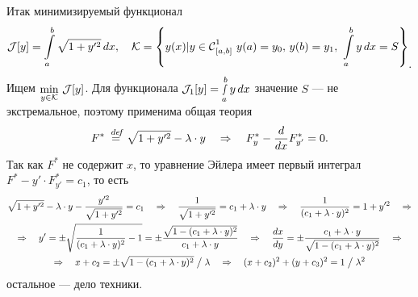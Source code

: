 Итак минимизируемый функционал
\begin{equation*}
	\hfill\J[y]=\int\limits_a^b\sqrt{1+y^{\prime2}}\,dx,\quad
	\K=\left\{y(x)|y\in\Cfn[{[a,b]}]{1}\ y(a)=y_0,\,y(b)=y_1,\ \int\limits_a^b y\,dx=S\right\}_{\displaystyle.}\hfill
\end{equation*}
Ищем $\min\limits_{y\in\mathcal{K}}\,\mathcal{J}[y]$. Для функционала $\mathcal{J}_1[y]=\smallint\limits_a^b y\,dx$ значение $S$ --- не экстремальное, поэтому применима общая теория
\begin{equation*}
	\hfill F^{\ast}\eqdef\sqrt{1+y^{\prime2}}-\lambda\cdot y\quad\Rightarrow\quad F^{\ast}_{y}-\der{}{x}F^{\ast}_{y'}=0.\hfill
\end{equation*}
Так как $F^{\ast}$ не содержит $x$, то уравнение Эйлера имеет первый интеграл $F^{\ast}-y'\cdot F^{\ast}_{y'}=c_1$, то есть
\begin{gather*}
	\sqrt{1+y^{\prime2}}-\lambda\cdot y-\frac{y^{\prime2}}{\sqrt{1+y^{\prime2}}}=c_1\quad\Rightarrow\quad
	\frac{1}{\sqrt{1+y^{\prime2}}}=c_1+\lambda\cdot y\quad\Rightarrow\quad\frac{1}{(c_1+\lambda\cdot y)^2}=1+y^{\prime2}\quad\Rightarrow\\\Rightarrow\quad y'=\pm\sqrt{\frac{1}{(c_1+\lambda\cdot y)^2}-1}=\pm\frac{\sqrt{1-(c_1+\lambda\cdot y)^2}}{c_1+\lambda\cdot y}\quad\Rightarrow\quad\frac{dx}{dy}=\pm\frac{c_1+\lambda\cdot y}{\sqrt{1-(c_1+\lambda\cdot y)^2}}\quad\Rightarrow\\\Rightarrow\quad x+c_2=\pm\sqrt{1-(c_1+\lambda\cdot y)^2}\bigm/\lambda\quad\Rightarrow\quad (x+c_2)^2+(y+c_3)^2=1\bigm/\lambda^2
\end{gather*}
остальное --- дело техники.
